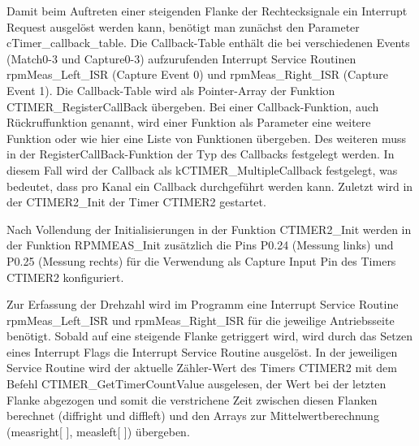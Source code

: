 Damit beim Auftreten einer steigenden Flanke der Rechtecksignale ein Interrupt Request ausgelöst werden kann, benötigt man zunächst den Parameter cTimer\_callback\_table. Die Callback-Table enthält die bei verschiedenen Events (Match0-3 und Capture0-3) aufzurufenden Interrupt Service Routinen rpmMeas\_Left\_ISR (Capture Event 0) und rpmMeas\_Right\_ISR (Capture Event 1). Die Callback-Table wird als Pointer-Array der Funktion CTIMER\_RegisterCallBack übergeben. Bei einer Callback-Funktion, auch Rückruffunktion genannt, wird einer Funktion als Parameter eine weitere Funktion oder wie hier eine Liste von Funktionen übergeben. Des weiteren muss in der RegisterCallBack-Funktion der Typ des Callbacks festgelegt werden. In diesem Fall wird der Callback als \glqq{}kCTIMER\_MultipleCallback\grqq{} festgelegt, was bedeutet, dass pro Kanal ein Callback durchgeführt werden kann. Zuletzt wird in der CTIMER2\_Init der Timer CTIMER2 gestartet.\vspace{11pt}

Nach Vollendung der Initialisierungen in der Funktion CTIMER2\_Init werden in der Funktion RPMMEAS\_Init zusätzlich die Pins P0.24 (Messung links) und P0.25 (Messung rechts) für die Verwendung als Capture Input Pin des Timers CTIMER2 konfiguriert.\vspace{11pt}

Zur Erfassung der Drehzahl wird im Programm eine Interrupt Service Routine rpmMeas\_Left\_ISR und rpmMeas\_Right\_ISR für die jeweilige Antriebsseite benötigt. Sobald auf eine steigende Flanke getriggert wird, wird durch das Setzen eines Interrupt Flags die Interrupt Service Routine ausgelöst. In der jeweiligen Service Routine wird der aktuelle Zähler-Wert des Timers CTIMER2 mit dem Befehl CTIMER\_GetTimerCountValue ausgelesen, der Wert bei der letzten Flanke abgezogen und somit die verstrichene Zeit zwischen diesen Flanken berechnet (diffright und diffleft) und den Arrays zur Mittelwertberechnung (measright[ ], measleft[ ]) übergeben.  

